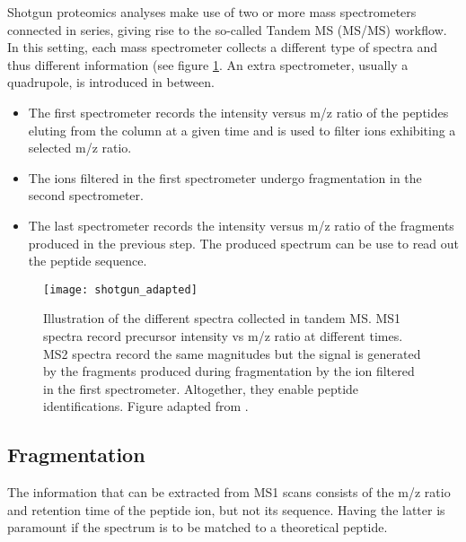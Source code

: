 \documentclass[thesis]{subfiles}
\begin{document}

Shotgun proteomics analyses make use of two or more mass spectrometers connected in series, giving rise to the so-called Tandem MS (\ac{MS/MS}) workflow. In this setting, each mass spectrometer collects a different type of spectra and thus different information (see figure \ref{fig:shotgun}. An extra spectrometer, usually a quadrupole, is introduced in between.

\begin{itemize}

\item The first spectrometer records the intensity versus \ac{m/z} ratio of the peptides eluting from the column at a given time and is used to filter ions exhibiting a selected \ac{m/z} ratio.

\item The ions filtered in the first spectrometer undergo fragmentation in the second spectrometer. %

\item The last spectrometer records the intensity versus \ac{m/z} ratio of the fragments produced in the previous step. The produced spectrum can be use to read out the peptide sequence.

\end{itemize}

\begin{figure}[!h]
\centering
\texttt{[image: shotgun\_adapted]}
\caption{Illustration of the different spectra collected in tandem MS. MS1 spectra record precursor intensity vs \ac{m/z} ratio at different times. MS2 spectra record the same magnitudes but the signal is generated by the fragments produced during fragmentation by the ion filtered in the first spectrometer. Altogether, they enable peptide identifications. Figure adapted from \cite{Verheggen2017}.}
\label{fig:shotgun}
\end{figure}

\subsection{Fragmentation}
\label{subsec:fragmentation}

The information that can be extracted from \ac{MS1} scans consists of the \ac{m/z} ratio and retention time of the peptide ion, but not its sequence. Having the latter is paramount if the spectrum is to be matched to a theoretical peptide.
\end{document}
